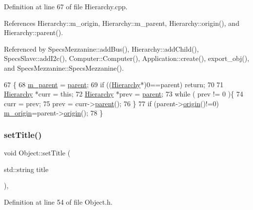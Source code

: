 Definition at line 67 of file Hierarchy.\+cpp.



References Hierarchy\+::m\+\_\+origin, Hierarchy\+::m\+\_\+parent, Hierarchy\+::origin(), and Hierarchy\+::parent().



Referenced by Specs\+Mezzanine\+::add\+Bus(), Hierarchy\+::add\+Child(), Specs\+Slave\+::add\+I2c(), Computer\+::\+Computer(), Application\+::create(), export\+\_\+obj(), and Specs\+Mezzanine\+::\+Specs\+Mezzanine().


\begin{DoxyCode}
67                                               \{
68   \hyperlink{classHierarchy_a5814bb280d4e8539ab25ab6cbfb9cc4f}{m\_parent} = \hyperlink{classHierarchy_a1c7bec8257e717f9c1465e06ebf845fc}{parent};
69   \textcolor{keywordflow}{if} ((\hyperlink{classHierarchy}{Hierarchy}*)0==parent) \textcolor{keywordflow}{return};
70 
71   \hyperlink{classHierarchy}{Hierarchy} *curr = \textcolor{keyword}{this};
72   \hyperlink{classHierarchy}{Hierarchy} *prev = \hyperlink{classHierarchy_a1c7bec8257e717f9c1465e06ebf845fc}{parent};
73   \textcolor{keywordflow}{while} ( prev != 0 )\{
74     curr = prev;
75     prev = curr->\hyperlink{classHierarchy_a1c7bec8257e717f9c1465e06ebf845fc}{parent}();
76   \}
77   \textcolor{keywordflow}{if} (parent->\hyperlink{classHierarchy_aee461dc930ce3871636ff87f075b1b83}{origin}()!=0) \hyperlink{classHierarchy_a16c73e557d3a7c156ffb5dc4102d148e}{m\_origin}=parent->\hyperlink{classHierarchy_aee461dc930ce3871636ff87f075b1b83}{origin}();
78 \}
\end{DoxyCode}
\mbox{\label{classObject_a89557dbbad5bcaa02652f5d7fa35d20f}} 
\subsubsection{\texorpdfstring{set\+Title()}{setTitle()}}
{\footnotesize\ttfamily void Object\+::set\+Title (\begin{DoxyParamCaption}\item[{std\+::string}]{title }\end{DoxyParamCaption})\hspace{0.3cm}{\ttfamily [inline]}, {\ttfamily [inherited]}}



Definition at line 54 of file Object.\+h.



